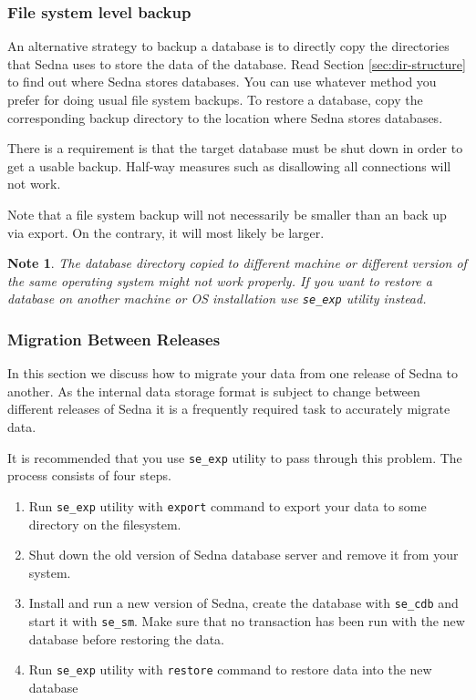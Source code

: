 \documentclass[a4paper,12pt]{article}
\newtheorem{note}{Note}
\begin{document}
\subsubsection{File system level backup}

An alternative strategy to backup a database is to directly copy the directories that Sedna
uses to store the data of the database. Read Section \ref{sec:dir-structure} to find out where
Sedna stores databases. You can use whatever method you prefer for doing usual file system backups.
To restore a database, copy the corresponding backup directory to the location where Sedna stores
databases.

There is a requirement is that the target database must be shut down in order to get a usable backup.
Half-way measures such as disallowing all connections will not work.

Note that a file system backup will not necessarily be smaller than an back up via export. On 
the contrary, it will most likely be larger.

\begin{note}
The database directory copied to different machine or different version of the same operating system 
might not work properly. If you want to restore a database on another machine or OS installation use
\verb!se_exp! utility instead.
\end{note}


\subsubsection{Migration Between Releases}

In this section we discuss how to migrate your data from one release of Sedna to another. 
As the internal data storage format is subject to change between different releases of Sedna it is a 
frequently required task to accurately migrate data.  

It is recommended that you use \verb!se_exp! utility to pass through this problem. The process 
consists of four steps.

\begin{enumerate}
\item
Run \verb!se_exp! utility with \verb!export! command to export your data to some 
directory on the filesystem.
\item
Shut down the old version of Sedna database server and remove it from your system. 
\item
Install and run a new version of Sedna, create the database with \verb!se_cdb! and start it with 
\verb!se_sm!. Make sure that no transaction has been run with the new database before restoring 
the data.
\item
Run \verb!se_exp! utility with \verb!restore! command to restore data into the new database
\end{enumerate}
\end{document}
